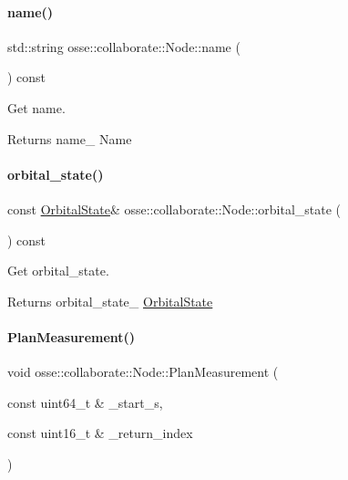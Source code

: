 \paragraph{\texorpdfstring{name()}{name()}}
{\footnotesize\ttfamily std\+::string osse\+::collaborate\+::\+Node\+::name (\begin{DoxyParamCaption}{ }\end{DoxyParamCaption}) const\hspace{0.3cm}{\ttfamily [inline]}}



Get name. 

\begin{DoxyReturn}{Returns}
name\+\_\+ Name 
\end{DoxyReturn}
\mbox{\label{classosse_1_1collaborate_1_1_node_a42ec8f451ee77becdb4d3cf5992c11c9}} 
\paragraph{\texorpdfstring{orbital\+\_\+state()}{orbital\_state()}}
{\footnotesize\ttfamily const \hyperlink{classosse_1_1collaborate_1_1_orbital_state}{Orbital\+State}\& osse\+::collaborate\+::\+Node\+::orbital\+\_\+state (\begin{DoxyParamCaption}{ }\end{DoxyParamCaption}) const\hspace{0.3cm}{\ttfamily [inline]}}



Get orbital\+\_\+state. 

\begin{DoxyReturn}{Returns}
orbital\+\_\+state\+\_\+ \hyperlink{classosse_1_1collaborate_1_1_orbital_state}{Orbital\+State} 
\end{DoxyReturn}
\mbox{\label{classosse_1_1collaborate_1_1_node_a39b4ab16083780371f5e4fa4acb406dc}} 
\paragraph{\texorpdfstring{Plan\+Measurement()}{PlanMeasurement()}}
{\footnotesize\ttfamily void osse\+::collaborate\+::\+Node\+::\+Plan\+Measurement (\begin{DoxyParamCaption}\item[{const uint64\+\_\+t \&}]{\+\_\+start\+\_\+s,  }\item[{const uint16\+\_\+t \&}]{\+\_\+return\+\_\+index }\end{DoxyParamCaption})}



